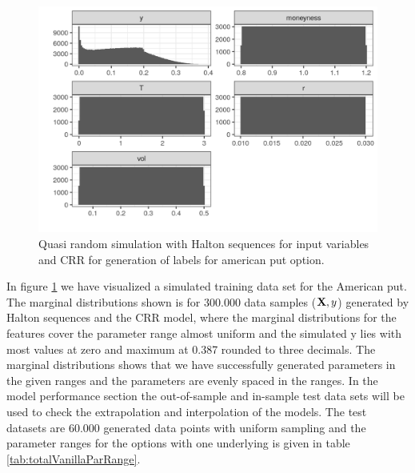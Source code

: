 \begin{figure}[th]
\centering
\includegraphics{Figures/marginalAmerPut.png}
\decoRule
\caption[Marginal Distributions For American Put]{Quasi random simulation with Halton sequences for input variables and CRR for generation of labels for american put option.}
\label{fig:marginalAmerPut}
\end{figure}

In figure \ref{fig:marginalAmerPut} we have visualized a simulated training data set for the American put. The marginal distributions shown is for $300.000$ data samples ($\mathbf{X},y$) generated by Halton sequences and the CRR model, where the marginal distributions for the features cover the parameter range almost uniform and the simulated y lies with most values at zero and maximum at 0.387 rounded to three decimals. The marginal distributions shows that we have successfully generated parameters in the given ranges and the parameters are evenly spaced in the ranges. In the model performance section the out-of-sample and in-sample test data sets will be used to check the extrapolation and interpolation of the models. The test datasets are 60.000 generated data points with uniform sampling and the parameter ranges for the options with one underlying is given in table \ref{tab:totalVanillaParRange}.


